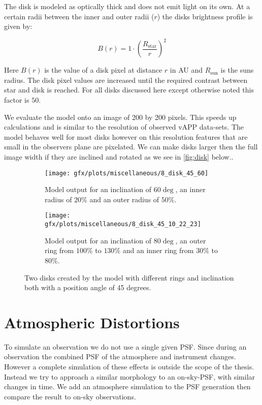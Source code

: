 The disk is modeled as optically thick and does not emit light on its own. At a certain radii between the inner and outer radii ($r$) the disks brightness profile is given by:

\begin{equation}
B(r) = 1 \cdot {\left(\frac{R_{\text{star}}}{r}\right)}^2
\end{equation}

Here $B(r)$ is the value of a disk pixel at distance $r$ in AU and $R_\text{sun}$ is the suns radius. The disk pixel values are increased until the required contrast between star and disk is reached. For all disks discussed here except otherwise noted this factor is $50$.

We evaluate the model onto an image of 200 by 200 pixels. This speeds up calculations and is similar to the resolution of observed \ac{vAPP} data-sets. The model behaves well for most disks however on this resolution features that are small in the observers plane are pixelated. We can make disks larger then the full image width if they are inclined and rotated as we see in \autoref{fig:disk} below..

\begin{figure}[h!]
  \begin{subfigure}[t]{0.5\textwidth}
    \texttt{[image: gfx/plots/miscellaneous/8\_disk\_45\_60]}
    \caption{Model output for an inclination of $60\deg$, an inner radius of $20\%$ and an outer radius of $50\%$.}
  \end{subfigure}
  \begin{subfigure}[t]{0.5\textwidth}
    \texttt{[image: gfx/plots/miscellaneous/8\_disk\_45\_10\_22\_23]}
    \caption{Model output for an inclination of $80\deg$, an outer ring from $100\%$ to $130\%$ and an inner ring from $30\%$ to $80\%$.}
  \end{subfigure}
  \caption{Two disks created by the model with different rings and inclination both with a position angle of 45 degrees.}
  \label{fig:disk}
\end{figure}





\section{Atmospheric Distortions}

To simulate an observation we do not use a single given \ac{PSF}. Since during an observation the combined \ac{PSF} of the atmosphere and instrument changes. However a complete simulation of these effects is outside the scope of the thesis. Instead we try to approach a similar morphology to an on-sky-\ac{PSF}, with similar changes in time. We add an atmosphere simulation to the PSF generation then compare the result to on-sky observations.

